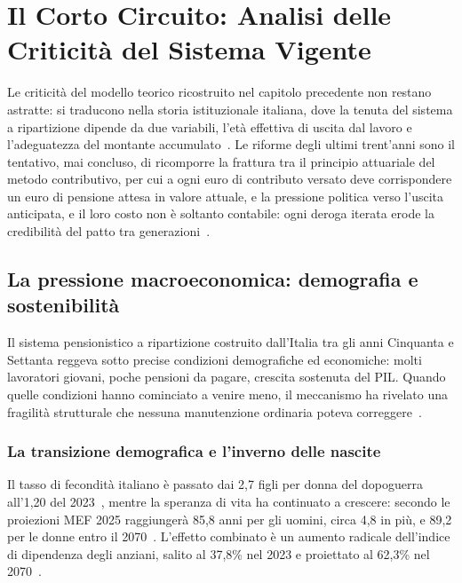 ﻿\chapter{Il Corto Circuito: Analisi delle Criticità del Sistema Vigente}

\noindent
Le criticità del modello teorico ricostruito nel capitolo precedente non restano astratte: si traducono nella storia istituzionale italiana, dove la tenuta del sistema a ripartizione dipende da due variabili, l'età effettiva di uscita dal lavoro e l'adeguatezza del montante accumulato~\cite{Bosi2018, RosenGayerRapallini2023}. Le riforme degli ultimi trent'anni sono il tentativo, mai concluso, di ricomporre la frattura tra il principio attuariale del metodo contributivo, per cui a ogni euro di contributo versato deve corrispondere un euro di pensione attesa in valore attuale, e la pressione politica verso l'uscita anticipata, e il loro costo non è soltanto contabile: ogni deroga iterata erode la credibilità del patto tra generazioni~\cite{LavoceRiformaDini, MEF_RGS2025}.

\section{La pressione macroeconomica: demografia e sostenibilità}

Il sistema pensionistico a ripartizione costruito dall'Italia tra gli anni Cinquanta e Settanta reggeva sotto precise condizioni demografiche ed economiche: molti lavoratori giovani, poche pensioni da pagare, crescita sostenuta del PIL. Quando quelle condizioni hanno cominciato a venire meno, il meccanismo ha rivelato una fragilità strutturale che nessuna manutenzione ordinaria poteva correggere~\cite{Bosi2018}.

\subsection{La transizione demografica e l'inverno delle nascite}

Il tasso di fecondità italiano è passato dai 2,7 figli per donna del dopoguerra all'1,20 del 2023~\cite{ISTAT_Natalita2024}, mentre la speranza di vita ha continuato a crescere: secondo le proiezioni MEF 2025 raggiungerà 85,8 anni per gli uomini, circa 4,8 in più, e 89,2 per le donne entro il 2070~\cite{MEF_RGS2025}. L'effetto combinato è un aumento radicale dell'indice di dipendenza degli anziani, salito al 37,8\% nel 2023 e proiettato al 62,3\% nel 2070~\cite{MEF_RGS2025}.


